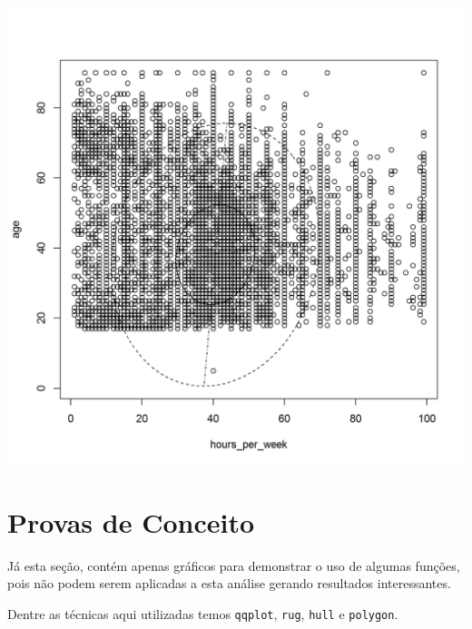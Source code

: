\documentclass{article}\usepackage[]{graphicx}\usepackage[]{color}
\makeatletter
\def\maxwidth{ %
  \ifdim\Gin@nat@width>\linewidth
    \linewidth
  \else
    \Gin@nat@width
  \fi
}
\newenvironment{knitrout}{}{} %
\makeatother
\begin{document}
\begin{knitrout}
\color{fgcolor}
\includegraphics[width=\maxwidth]{figure/agehours-1} 

\end{knitrout}

\section{Provas de Conceito}
\par Já esta seção, contém apenas gráficos para demonstrar o uso de algumas funções, pois não podem serem aplicadas a esta análise gerando resultados interessantes.
\par Dentre as técnicas aqui utilizadas temos \texttt{qqplot}, \texttt{rug}, \texttt{hull} e \texttt{polygon}.
\end{document}
